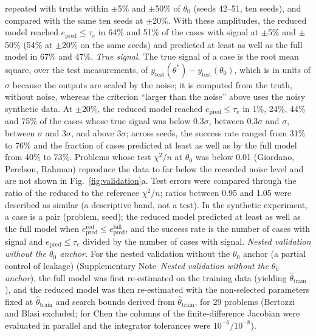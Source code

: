 \documentclass[pdflatex,sn-nature]{sn-jnl}
\theoremstyle{plain}
\begin{document}
repeated with truths within $\pm$5\% and $\pm$50\% of $\theta_0$ (seeds 42--51, ten seeds), and compared with the same ten seeds at $\pm$20\%. With these amplitudes, the reduced model reached $e_{\mathrm{pred}}\le\tau_e$ in 64\% and 51\% of the cases with signal at $\pm$5\% and $\pm$50\% (54\% at $\pm$20\% on the same seeds) and predicted at least as well as the full model in 67\% and 47\%. \label{met:val-signal}\emph{True signal.} The true signal of a case is the root mean square, over the test measurements, of $y_{\mathrm{test}}(\theta^\ast)-y_{\mathrm{test}}(\theta_0)$, which is in units of $\sigma$ because the outputs are scaled by the noise; it is computed from the truth, without noise, whereas the criterion ``larger than the noise'' above uses the noisy synthetic data. At $\pm$20\%, the reduced model reached $e_{\mathrm{pred}}\le\tau_e$ in 1\%, 24\%, 44\% and 75\% of the cases whose true signal was below $0.3\sigma$, between $0.3\sigma$ and $\sigma$, between $\sigma$ and $3\sigma$, and above $3\sigma$; across seeds, the success rate ranged from 31\% to 76\% and the fraction of cases predicted at least as well as by the full model from 40\% to 73\%. Problems whose test $\chi^2/n$ at $\theta_0$ was below 0.01 (Giordano, Perelson, Rahman) reproduce the data to far below the recorded noise level and are not shown in Fig.~\ref{fig:validation}a. Test errors were compared through the ratio of the reduced to the reference $\chi^2/n$; ratios between 0.95 and 1.05 were described as similar (a descriptive band, not a test). In the synthetic experiment, a case is a pair (problem, seed); the reduced model predicted at least as well as the full model when $e^{\mathrm{red}}_{\mathrm{pred}}\le e^{\mathrm{full}}_{\mathrm{pred}}$, and the success rate is the number of cases with signal and $e_{\mathrm{pred}}\le\tau_e$ divided by the number of cases with signal. \label{met:val-nested}\emph{Nested validation without the $\theta_0$ anchor.} For the nested validation without the $\theta_0$ anchor (a partial control of leakage) (Supplementary Note~\textit{Nested validation without the $\theta_0$ anchor}), the full model was first re-estimated on the training data (yielding $\hat\theta_{\mathrm{train}}$), and the reduced model was then re-estimated with the non-selected parameters fixed at $\hat\theta_{\mathrm{train}}$ and search bounds derived from $\hat\theta_{\mathrm{train}}$, for 29 problems (Bertozzi and Blasi excluded; for Chen the columns of the finite-difference Jacobian were evaluated in parallel and the integrator tolerances were $10^{-6}/10^{-8}$).
\end{document}
